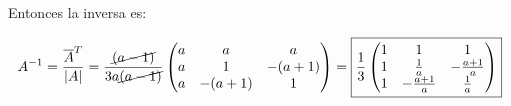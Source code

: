 \documentclass[a4paper,12pt]{article}
\begin{document}
\begin{ejercicio}[title=Ejercicio 17]
\vspace{0.5em}

Entonces la inversa es:

\[
A^{-1} = \frac{\overline{A}^T}{|A|} = \frac{\cancel{(a-1)}}{3a\cancel{(a-1)}} \begin{pmatrix}
    a & a & a \\
    a & 1 & -(a+1) \\
    a & -(a+1) & 1
\end{pmatrix}
= \boxed{\frac{1}{3}\begin{pmatrix}
    1 & 1 & 1 \\
    1 & \frac{1}{a} & -\frac{a+1}{a} \\
    1 & -\frac{a+1}{a} & \frac{1}{a}
\end{pmatrix}}
\]
\end{ejercicio}
\end{document}
